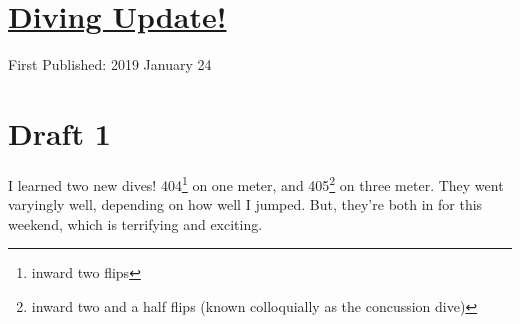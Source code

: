 \documentclass[12pt]{article}[titlepage]
\newcommand{\1}{\={a}}
\newcommand{\2}{\={e}}
\newcommand{\3}{\={\i}}
\newcommand{\4}{\=o}
\newcommand{\5}{\=u}
\newcommand{\6}{\={A}}
\renewcommand{\,}{\textsuperscript{,}}
\begin{document}
\doublespacing
\section{\href{diving-23-jan.html}{Diving Update!}}
First Published: 2019 January 24
\section{Draft 1}
I learned two new dives!
404\footnote{inward two flips} on one meter, and 405\footnote{inward two and a half flips (known colloquially as the concussion dive)} on three meter.
They went varyingly well, depending on how well I jumped.
But, they're both in for this weekend, which is terrifying and exciting.
\end{document}
